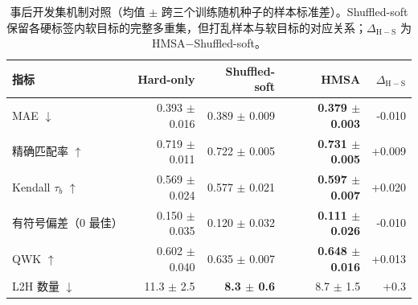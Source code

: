 \begin{table}[H]
\centering
\caption{事后开发集机制对照（均值 $\pm$ 跨三个训练随机种子的样本标准差）。Shuffled-soft 保留各硬标签内软目标的完整多重集，但打乱样本与软目标的对应关系；$\Delta_{\mathrm{H-S}}$ 为 HMSA$-$Shuffled-soft。}
\label{tab:dev_mechanism_summary}
\small
\setlength{\tabcolsep}{3.8pt}
\begin{tabular}{lrrrr}
\toprule
指标 & Hard-only & Shuffled-soft & HMSA & $\Delta_{\mathrm{H-S}}$ \\
\midrule
MAE $\downarrow$ & 0.393 $\pm$ 0.016 & 0.389 $\pm$ 0.009 & \textbf{0.379 $\pm$ 0.003} & -0.010 \\
精确匹配率 $\uparrow$ & 0.719 $\pm$ 0.011 & 0.722 $\pm$ 0.005 & \textbf{0.731 $\pm$ 0.005} & +0.009 \\
Kendall $\tau_b$ $\uparrow$ & 0.569 $\pm$ 0.024 & 0.577 $\pm$ 0.021 & \textbf{0.597 $\pm$ 0.007} & +0.020 \\
有符号偏差（0 最佳） & 0.150 $\pm$ 0.035 & 0.120 $\pm$ 0.032 & \textbf{0.111 $\pm$ 0.026} & -0.010 \\
QWK $\uparrow$ & 0.602 $\pm$ 0.040 & 0.635 $\pm$ 0.007 & \textbf{0.648 $\pm$ 0.016} & +0.013 \\
L2H 数量 $\downarrow$ & 11.3 $\pm$ 2.5 & \textbf{8.3 $\pm$ 0.6} & 8.7 $\pm$ 1.5 & +0.3 \\
\bottomrule
\end{tabular}
\end{table}
